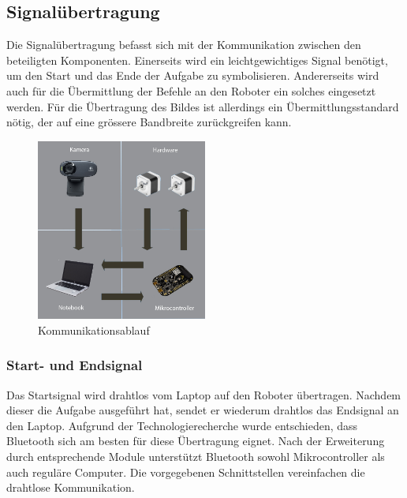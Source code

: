 \subsection{Signalübertragung}
Die Signalübertragung befasst sich mit der Kommunikation zwischen den beteiligten Komponenten. Einerseits wird ein leichtgewichtiges Signal benötigt, um den Start und das Ende der Aufgabe zu symbolisieren. Andererseits wird auch für die Übermittlung der Befehle an den Roboter ein solches eingesetzt werden. Für die Übertragung des Bildes ist allerdings ein Übermittlungsstandard nötig, der auf eine grössere Bandbreite zurückgreifen kann.

\begin{figure}[h!]          
	\centering             
	\includegraphics[width=0.5\textwidth]{fig/kommunikationsablauf.jpg}    
	\caption{Kommunikationsablauf}
	
	\label{fig:Kommunikationsablauf}
\end{figure}
\noindent
\subsubsection{Start- und Endsignal}
Das Startsignal wird drahtlos vom Laptop auf den Roboter übertragen. Nachdem dieser die Aufgabe ausgeführt hat, sendet er wiederum drahtlos das Endsignal an den Laptop. Aufgrund der Technologierecherche wurde entschieden, dass Bluetooth sich am besten für diese Übertragung eignet. Nach der Erweiterung durch entsprechende Module unterstützt Bluetooth sowohl Mikrocontroller als auch reguläre Computer. Die vorgegebenen Schnittstellen vereinfachen die drahtlose Kommunikation.
